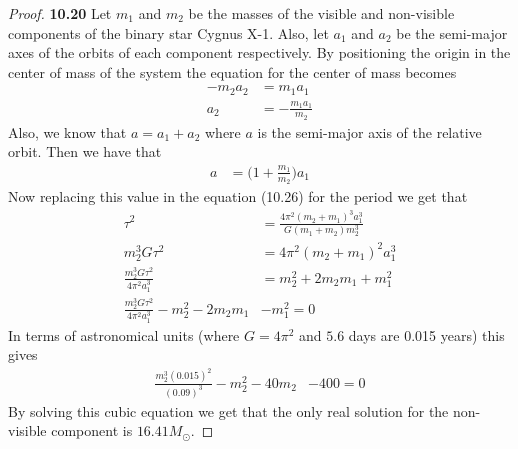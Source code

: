 \documentclass[11pt]{article}
\theoremstyle{definition}
\begin{document}
	\begin{proof}{\textbf{10.20}}
        Let $m_1$ and $m_2$ be the masses of the visible and non-visible
        components of the binary star Cygnus X-1. 
        Also, let $a_1$ and $a_2$ be the semi-major axes of the orbits
        of each component respectively. By positioning the origin in the
        center of mass of the system the equation for the center of mass
        becomes
        \begin{align*}
            -m_2a_2 &= m_1a_1\\
            a_2 &= -\frac{m_1a_1}{m_2}
        \end{align*}
        Also, we know that $a = a_1 + a_2$ where $a$ is the semi-major axis of
        the relative orbit. Then we have that
        \begin{align*}
            a &= \bigg(1 + \frac{m_1}{m_2}\bigg)a_1
        \end{align*}
        Now replacing this value in the equation (10.26) for the period we get
        that
        \begin{align*}
            \tau^2 &= \frac{4\pi^2(m_2 + m_1)^3a_1^3}{G(m_1 + m_2)m_2^3}\\
            m_2^3G\tau^2 &= 4\pi^2(m_2 + m_1)^2a_1^3\\
            \frac{m_2^3G\tau^2}{4\pi^2a_1^3} &= m_2^2 + 2m_2m_1 + m_1^2\\
            \frac{m_2^3G\tau^2}{4\pi^2a_1^3} - m_2^2 - 2m_2m_1 &- m_1^2 = 0
        \end{align*}
        In terms of astronomical units (where $G=4\pi^2$ and $5.6$ days are
        0.015 years) this gives
        \begin{align*}
            \frac{m_2^3(0.015)^2}{(0.09)^3} - m_2^2 - 40m_2 &- 400 = 0            
        \end{align*}
        By solving this cubic equation we get that the only real solution
        for the non-visible component is $16.41 M_{\odot}$.
    \end{proof}
\cleardoublepage
\end{document}
